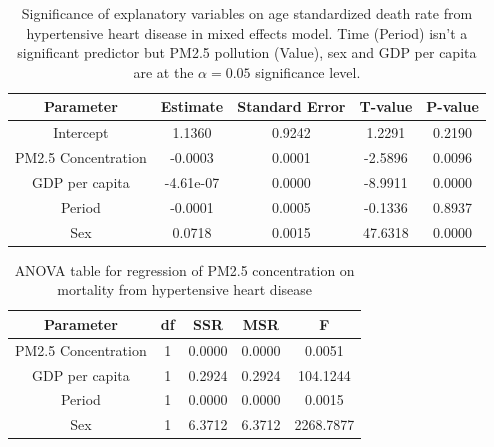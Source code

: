 \documentclass[12pt, letterpaper, twoside]{article}
\begin{document}
\begin{table}[h!]
\centering
\begin{tabular}{|c | c c c c|}
\toprule
Parameter & Estimate & Standard Error & T-value & P-value \\ [0.5ex]
\midrule
Intercept &	1.1360 &	0.9242 &	1.2291 &	0.2190 \\
PM2.5 Concentration &	-0.0003 &	0.0001 &	-2.5896 &	0.0096 \\
GDP per capita &	-4.61e-07 &	0.0000 &	-8.9911 &	0.0000 \\
Period &	-0.0001 &	0.0005 &	-0.1336 &	0.8937 \\
Sex &	0.0718  &	0.0015 &	47.6318 &	0.0000 \\ [1ex]
\bottomrule
\end{tabular}
\label{tab:table5}
  \caption{Significance of explanatory variables on age standardized death rate
  from hypertensive heart disease in mixed effects model. Time (Period) isn't a
  significant predictor but PM2.5 pollution (Value), sex and GDP per capita are
  at the \begin{math}\alpha = 0.05\end{math} significance level.}
\end{table}

\begin{table}[h!]
\centering
\begin{tabular}{|c | c c c c|}
\toprule
Parameter & df & SSR & MSR & F \\ [0.5ex]
\midrule
PM2.5 Concentration & 1 & 0.0000 & 0.0000 & 0.0051 \\
GDP per capita & 1 & 0.2924 & 0.2924 & 104.1244 \\
Period & 1 & 0.0000 & 0.0000 & 0.0015 \\
Sex & 1 & 6.3712 & 6.3712 & 2268.7877 \\ [1ex]
\bottomrule
\end{tabular}
\label{tab:table6}
\caption{ANOVA table for regression of PM2.5 concentration on mortality from
hypertensive heart disease}
\end{table}
\end{document}
